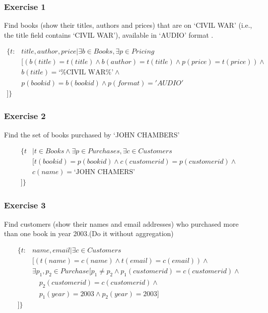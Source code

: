 \documentclass{beamer}
\begin{document}
\begin{frame}[fragile]
  \frametitle{Exercise 1}
  Find books (show their titles, authors and prices) that are on `CIVIL WAR' (i.e., the title field contains `CIVIL WAR'), available in `AUDIO' format \footnotemark {}. 

\begin{align*}
\{t: &title, author, price| \exists b \in Books, \exists p \in Pricing \\
&[(b(title)=t(title)\wedge b(author)=t(title) \wedge p(price)=t(price)) \wedge \\
& b(title)=\text{`\%CIVIL WAR\%'} \wedge \\
& p(bookid)=b(bookid) \wedge p(format)='AUDIO'\\
]\}
\end{align*}
\end{frame}

\begin{frame}[fragile]
\frametitle{Exercise 2}
Find the set of books purchased by  `JOHN CHAMBERS'

\begin{align*}
\{t&|t\in Books\wedge \exists p \in Purchases, \exists c \in Customers \\
&[t(bookid)=p(bookid) \wedge c(customerid)=p(customerid) \wedge \\
&c(name)=\text{`JOHN CHAMERS'}\\
]\}
\end{align*}


\end{frame}

\begin{frame}[fragile]
\frametitle{Exercise 3}
Find customers (show their names and email addresses) who purchased more than one book in year 2003.(Do it without aggregation) 

\begin{align*}
\{t: &name, email| \exists c \in Customers \\
&[(t(name)=c(name)\wedge t(email)=c(email)) \wedge \\
& \exists p_1,p_2 \in Purchase [p_1\neq p_2 \wedge p_1(customerid)=c(customerid) \wedge \\ 
&\quad p_2(customerid)=c(customerid) \wedge \\
&\quad p_1(year)=2003 \wedge p_2(year)=2003]\\
]\}
\end{align*}
\end{frame}
\end{document}
